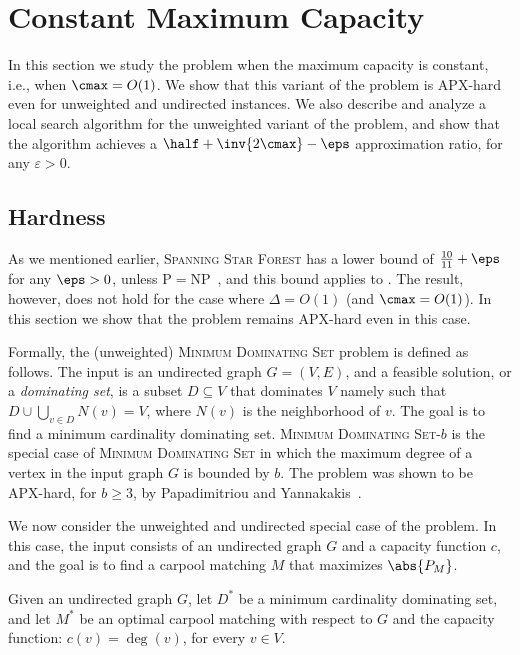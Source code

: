 
\section{Constant Maximum Capacity}
\label{sec:cmax}
In this section we study the \carpool problem when the maximum
capacity is constant, i.e., when $\cmax = O(1)$.  We show that this
variant of the problem is APX-hard even for unweighted and undirected
instances.  We also describe and analyze a local search algorithm for
the unweighted variant of the problem, and show that the algorithm
achieves a $\half + \inv{2\cmax} - \eps$ approximation ratio, for any
$\varepsilon > 0$.


\subsection{Hardness}
\label{sec:hardness}

As we mentioned earlier, \textsc{Spanning Star Forest} has a lower
bound of $\frac{10}{11} + \eps$ for any $\eps > 0$, unless
P$=$NP~\cite{ChakrabartyGoel10}, and this bound applies to \carpool.
%
The result, however, does not hold for the case where $\Delta = O(1)$
(and $\cmax = O(1)$).  In this section we show that the problem remains
APX-hard even in this case.

Formally, the (unweighted) \textsc{Minimum Dominating Set} problem is
defined as follows.  The input is an undirected graph $G = (V,E)$, and
a feasible solution, or a \emph{dominating set}, is a subset
$D \subseteq V$ that dominates $V$ namely such that
$D \cup \bigcup_{v \in D} N(v) = V$, where $N(v)$ is the neighborhood
of $v$.  The goal is to find a minimum cardinality dominating set.
%
\textsc{Minimum Dominating Set-$b$} is the special case of
\textsc{Minimum Dominating Set} in which
the maximum degree of a vertex in the input graph $G$ is bounded by
$b$.  The problem was shown to be APX-hard, for $b \geq 3$, by
Papadimitriou and Yannakakis~\cite{PapYan88}.

We now consider the unweighted and undirected special case of
the \carpool problem.  In this case, the input consists of an
undirected graph $G$ and a capacity function $c$, and the goal is to
find a carpool matching $M$ that maximizes $\abs{P_M}$.

Given an undirected graph $G$, let $D^*$ be a minimum cardinality
dominating set, and let $M^*$ be an optimal carpool matching with
respect to $G$ and the capacity function: $c(v) = \deg(v)$, for every
$v \in V$.


